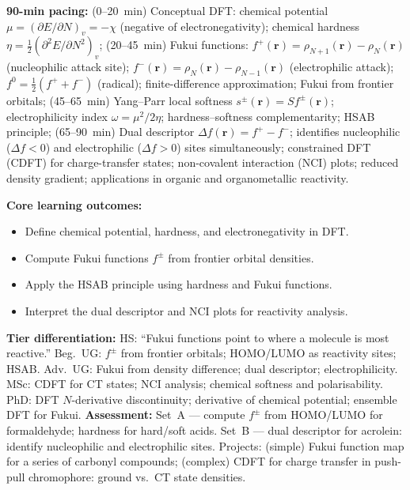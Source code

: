 \documentclass[11pt,a4paper]{article}
\begin{document}
\medskip

\begin{tcolorbox}[chembox, title={Module~III.3 / L05: Useful DFT Quantities --- Fukui Functions and Reactivity Indices}]
\textbf{90-min pacing:} (0--20~min) Conceptual DFT: chemical potential $\mu=(\partial E/\partial N)_v=-\chi$ (negative of electronegativity); chemical hardness $\eta=\tfrac{1}{2}(\partial^2 E/\partial N^2)_v$; (20--45~min) Fukui functions: $f^+(\mathbf{r})=\rho_{N+1}(\mathbf{r})-\rho_N(\mathbf{r})$ (nucleophilic attack site); $f^-(\mathbf{r})=\rho_N(\mathbf{r})-\rho_{N-1}(\mathbf{r})$ (electrophilic attack); $f^0=\tfrac{1}{2}(f^++f^-)$ (radical); finite-difference approximation; Fukui from frontier orbitals; (45--65~min) Yang--Parr local softness $s^\pm(\mathbf{r})=Sf^\pm(\mathbf{r})$; electrophilicity index $\omega=\mu^2/2\eta$; hardness--softness complementarity; HSAB principle; (65--90~min) Dual descriptor $\Delta f(\mathbf{r})=f^+-f^-$; identifies nucleophilic ($\Delta f<0$) and electrophilic ($\Delta f>0$) sites simultaneously; constrained DFT (CDFT) for charge-transfer states; non-covalent interaction (NCI) plots; reduced density gradient; applications in organic and organometallic reactivity.

\medskip\textbf{Core learning outcomes:}
\begin{itemize}[leftmargin=1.4em,topsep=2pt,itemsep=1pt]
  \item Define chemical potential, hardness, and electronegativity in DFT.
  \item Compute Fukui functions $f^\pm$ from frontier orbital densities.
  \item Apply the HSAB principle using hardness and Fukui functions.
  \item Interpret the dual descriptor and NCI plots for reactivity analysis.
\end{itemize}
\medskip\textbf{Tier differentiation:}
HS: ``Fukui functions point to where a molecule is most reactive.''
Beg.\ UG: $f^\pm$ from frontier orbitals; HOMO/LUMO as reactivity sites; HSAB.
Adv.\ UG: Fukui from density difference; dual descriptor; electrophilicity.
MSc: CDFT for CT states; NCI analysis; chemical softness and polarisability.
PhD: DFT $N$-derivative discontinuity; derivative of chemical potential; ensemble DFT for Fukui.
\medskip\textbf{Assessment:}
Set~A --- compute $f^\pm$ from HOMO/LUMO for formaldehyde; hardness for hard/soft acids.
Set~B --- dual descriptor for acrolein: identify nucleophilic and electrophilic sites.
Projects: (simple) Fukui function map for a series of carbonyl compounds; (complex) CDFT for charge transfer in push-pull chromophore: ground vs.\ CT state densities.
\end{tcolorbox}
\end{document}
